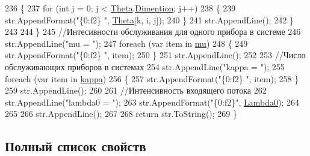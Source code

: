\begin{DoxyCode}
236                 \{
237                     \textcolor{keywordflow}{for} (\textcolor{keywordtype}{int} j = 0; j < \hyperlink{class_network_descriptions_1_1_description_o_f_j_q_n_af8d4bf8f19a4db2daef14d0dafd77a00}{Theta}.\hyperlink{class_network_descriptions_1_1_routing_matrix_a417bebac18f3b241d4e40d55d9b44213}{Dimention}; j++)
238                     \{
239                         str.AppendFormat(\textcolor{stringliteral}{"\{0:f2\} "}, \hyperlink{class_network_descriptions_1_1_description_o_f_j_q_n_af8d4bf8f19a4db2daef14d0dafd77a00}{Theta}[k, i, j]);
240                     \}
241                     str.AppendLine();
242                 \}
243 
244             \}
245             \textcolor{comment}{//Интесивности обслуживания для одного прибора в системе}
246             str.AppendLine(\textcolor{stringliteral}{"mu = "});
247             \textcolor{keywordflow}{foreach} (var item \textcolor{keywordflow}{in} \hyperlink{class_network_descriptions_1_1_description_o_f_j_q_n_a378792ff9db7825dfeee852298fd3314}{mu})
248             \{
249                 str.AppendFormat(\textcolor{stringliteral}{"\{0:f2\}  "}, item);
250             \}
251             str.AppendLine();
252 
253             \textcolor{comment}{//Число обслуживающих приборов в системах}
254             str.AppendLine(\textcolor{stringliteral}{"kappa = "});
255             \textcolor{keywordflow}{foreach} (var item \textcolor{keywordflow}{in} \hyperlink{class_network_descriptions_1_1_description_o_f_j_q_n_a3a88e6ce220ecbbe4a056fedc8d6595c}{kappa})
256             \{
257                 str.AppendFormat(\textcolor{stringliteral}{"\{0:f2\}  "}, item);
258             \}
259             str.AppendLine();
260 
261             \textcolor{comment}{//Интенсивность входящего потока}
262             str.AppendLine(\textcolor{stringliteral}{"lambda0 = "});
263             str.AppendFormat(\textcolor{stringliteral}{"\{0:f2\}"}, \hyperlink{class_network_descriptions_1_1_description_o_f_j_q_n_a0670c1d5fa5d487f7bddb667d421a85c}{Lambda0});
264 
265 
266             str.AppendLine();
267 
268             \textcolor{keywordflow}{return} str.ToString();
269         \}
\end{DoxyCode}


\subsection{Полный список свойств}
